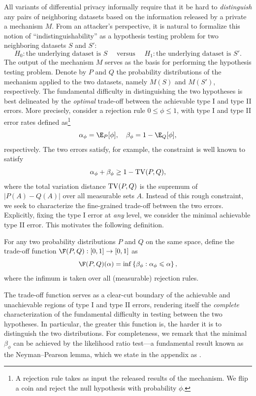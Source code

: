 All variants of differential privacy informally require that it be hard to \textit{distinguish} any pairs of neighboring datasets based on the information released by a private a mechanism $M$. From an attacker's perspective, it is natural to formalize this notion of  ``indistinguishability'' as a hypothesis testing problem for two neighboring datasets $S$ and $S'$:
\[
H_0: \text{the underlying dataset is } S \quad\text{ versus }\quad H_1: \text{the underlying dataset is } S'.
\]
The output of the mechanism $M$ serves as the basis for performing the hypothesis testing problem. Denote by $P$ and $Q$ the probability distributions of the mechanism applied to the two datasets, namely $M(S)$ and $M(S')$, respectively. The fundamental difficulty in distinguishing the two hypotheses is best delineated by the \textit{optimal} trade-off between the achievable type I and type II errors. More precisely, consider a rejection rule $0 \le \phi \le 1$, with type I and type II error rates defined as\footnote{A rejection rule takes as input the released results of the mechanism. We flip a coin and reject the null hypothesis with probability $\phi$.}
\[
\alpha_\phi = \E_{P}[\phi], \quad \beta_\phi = 1 - \E_{Q}[\phi],
\]
respectively. The two errors satisfy, for example, the constraint is well known to satisfy
\begin{equation}\label{eq:tv_norm}
\alpha_{\phi} + \beta_{\phi} \ge 1 - \mathrm{TV}(P, Q),
\end{equation}
where the total variation distance $\mathrm{TV}(P, Q)$ is the supremum of $|P(A) - Q(A)|$ over all measurable sets $A$. Instead of this rough constraint, we seek to characterize the fine-grained trade-off between the two errors. Explicitly, fixing the type I error at \textit{any} level, we consider the minimal achievable type II error. This motivates the following definition.
\begin{definition} \label{def:trade-off}
For any two probability distributions $P$ and $Q$ on the same space, define the trade-off function $\F(P, Q): [0, 1] \rightarrow [0, 1]$ as
\[
\F(P, Q)(\alpha) = \inf \left\{ \beta_\phi: \alpha_\phi \leqslant \alpha \right\},
\]
where the infimum is taken over all (measurable) rejection rules.
\end{definition}
The trade-off function serves as a clear-cut boundary of the achievable and unachievable regions of type I and type II errors, rendering itself the \textit{complete} characterization of the fundamental difficulty in testing between the two hypotheses. In particular, the greater this function is, the harder it is to distinguish the two distributions. For completeness, we remark that the minimal $\beta_{\phi}$ can be achieved by the likelihood ratio test---a fundamental result known as the Neyman--Pearson lemma, which we state in the appendix as .




